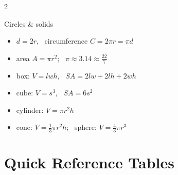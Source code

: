 {\begin{multicols}{2}
\begin{concept}{Circles \& solids}
\begin{itemize}[leftmargin=1em]
\item $d = 2r$, \ circumference $C = 2\pi r = \pi d$
\item area $A = \pi r^2$; \ $\pi \approx 3.14 \approx \frac{22}{7}$
\item box: $V = lwh$, \ $SA = 2lw + 2lh + 2wh$
\item cube: $V = s^3$, \ $SA = 6s^2$
\item cylinder: $V = \pi r^2 h$
\item cone: $V = \frac13\pi r^2 h$; \ sphere: $V = \frac43\pi r^3$
\end{itemize}
\end{concept}
\end{multicols}
}

\chapter*{Quick Reference Tables}

